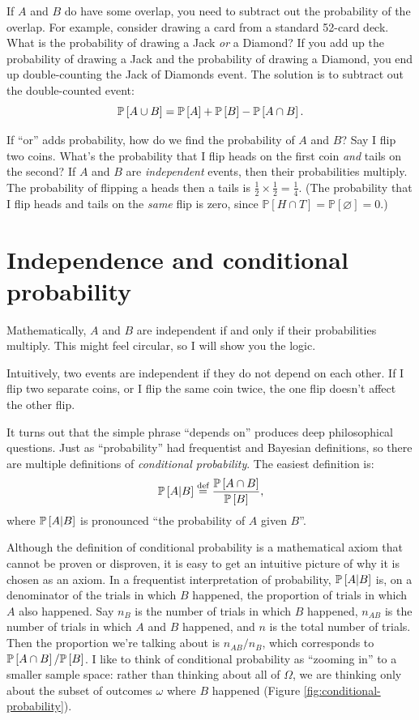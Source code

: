 If $A$ and $B$ do have some overlap, you need to subtract out the probability
of the overlap. For example, consider drawing a card
from a standard 52-card deck. What is the probability of drawing a Jack \emph{or} a
Diamond? If you add up the probability of drawing a Jack and the probability
of drawing a Diamond, you end up double-counting the Jack of Diamonds event.
The solution is to subtract out the double-counted event:
$$
\mathbb{P}\left[{A \cup B}\right] = \mathbb{P}\left[{A}\right] + \mathbb{P}\left[{B}\right] - \mathbb{P}\left[{A \cap B}\right].
$$

If ``or'' adds probability, how do we
find the probability of $A$ and $B$? Say I flip two coins. What's the
probability that I flip heads on the first coin \emph{and} tails on the second?
If $A$ and $B$ are \emph{independent} events, then their probabilities
multiply. The probability of flipping a heads then a tails is $\tfrac{1}{2} \times
\tfrac{1}{2} = \tfrac{1}{4}$. (The probability that I flip heads and tails on
the \emph{same} flip is zero, since
$\mathbb{P}[H \cap T] = \mathbb{P}[\varnothing] = 0$.)

\section{Independence and conditional probability}

Mathematically, $A$ and $B$ are independent if and only if their probabilities
multiply. This might feel circular, so I will show you the logic.

Intuitively, two events are independent if they do not depend on each other. If
I flip two separate coins, or I flip the same coin twice, the one flip doesn't
affect the other flip.

It turns out that the simple phrase ``depends on'' produces deep philosophical questions.
Just as ``probability'' had frequentist and Bayesian definitions, so there are
multiple definitions of \emph{conditional probability}. The easiest
definition is:
\begin{equation*}
\mathbb{P}\left[{A | B}\right] \stackrel{\text{def}}{=} \frac{\mathbb{P}\left[{A \cap B}\right]}{\mathbb{P}\left[{B}\right]},
\end{equation*}
where $\mathbb{P}\left[{A | B}\right]$ is pronounced ``the probability of $A$ given $B$''.

Although the definition of conditional probability is a mathematical axiom that
cannot be proven or disproven, it is easy to get an intuitive picture of why it
is chosen as an axiom. In a frequentist interpretation of probability, $\mathbb{P}\left[{A
| B}\right]$ is, on a denominator of the trials in which $B$ happened, the proportion
of trials in which $A$ also happened. Say $n_B$ is the number of trials in
which $B$ happened, $n_{AB}$ is the number of trials in which $A$ and $B$
happened, and $n$ is the total number of trials. Then the proportion we're
talking about is $n_{AB} / n_B$, which corresponds to $\mathbb{P}\left[{A \cap B}\right] /
\mathbb{P}\left[{B}\right]$. I like to think of conditional probability as ``zooming in'' to a
smaller sample space: rather than thinking about all of $\Omega$, we are
thinking only about the subset of outcomes $\omega$ where $B$ happened (Figure
\ref{fig:conditional-probability}).

